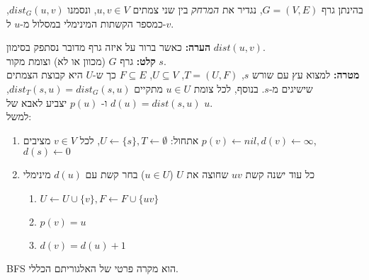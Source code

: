 \begin{definition}[מרחק]
בהינתן גרף 
$G = (V, E)$,
נגדיר את 
\emph{המרחק}
בין שני צמתים 
$u,v \in V$,
ונסמנו 
$dist_G(u,v)$,
כמספר הקשתות המינימלי במסלול מ-$u$ ל-$v$.
\end{definition}
\noindent
\textbf{הערה:}
כאשר ברור על איזה גרף מדובר נסתפק בסימון 
$dist(u,v)$.
\vspace{5mm}
\\
\textbf{קלט:}
גרף $G$ (מכוון או לא) וצומת מקור $s$.
\\
\textbf{מטרה:}
למצוא עץ עם שורש $s$,
$T = (U, F)$, 
$U \subseteq V$, 
$F \subseteq E$
כך ש-$U$ היא קבוצת הצמתים שישיגים מ-$s$.
בנוסף, לכל צומת 
$u \in U$
מתקיים
$dist_T(s, u) = dist_G(s, u)$,
$d(u) = dist(s,u)$
ו-%
$p(u)$
יצביע לאבא של 
$u$.
\\
למשל:
\begin{center}
\end{center}

\begin{enumerate}
\item
אתחול:
$U \leftarrow \{s\}, T \leftarrow \emptyset$, 
לכל 
$v \in V$
מציבים
$p(v) \leftarrow nil, d(v) \leftarrow \infty$,
$d(s) \leftarrow 0$
\item 
\label{item:bfs:while}
כל עוד ישנה קשת 
$uv$
שחוצה את $U$ 
($u \in U$)
בחר קשת עם 
$d(u)$
מינימלי
	\begin{enumerate}
	\item
	$U \leftarrow U \cup \{v\}, F \leftarrow F \cup \{uv\}$
	\item
	$p(v) = u$
	\item
	$d(v) = d(u) + 1$
	\end{enumerate}
\end{enumerate}
BFS
הוא מקרה פרטי של האלגוריתם הכללי.

